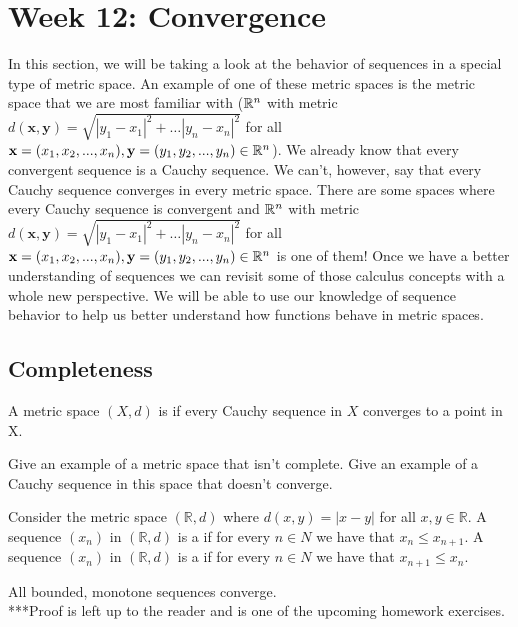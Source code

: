 \documentclass[../main.tex]{subfiles}
\begin{document}
\section{Week 12: Convergence}
In this section, we will be taking a look at the behavior of sequences in a special type of metric space. An example of one of these metric spaces is the metric space that we are most familiar with ($\mathbb R^n$ with metric $d(\textbf{x},\textbf{y}) = \sqrt{|y_1 - x_1|^2 + \dots |y_n - x_n|^2}$ for all $\textbf{x} = (x_1,x_2, ...,x_n), \textbf{y} = (y_1,y_2, ...,y_n) \in \mathbb R^n$). We already know that every convergent sequence is a Cauchy sequence. We can't, however, say that every Cauchy sequence converges in every metric space. There are some spaces where every Cauchy sequence is convergent and  $\mathbb R^n$ with metric $d(\textbf{x},\textbf{y}) = \sqrt{|y_1 - x_1|^2 + \dots |y_n - x_n|^2}$ for all $\textbf{x} = (x_1,x_2, ...,x_n), \textbf{y} = (y_1,y_2, ...,y_n) \in \mathbb R^n$ is one of them! Once we have a better understanding of sequences we can revisit some of those calculus concepts with a whole new perspective. We will be able to use our knowledge of sequence behavior to help us better understand how functions behave in metric spaces.

\subsection{Completeness}
\begin{definition}[completeness]
    A metric space $(X,d)$ is  if every Cauchy sequence in $X$ converges to a point in X.
\end{definition}
\begin{exercise}
Give an example of a metric space that isn't complete. Give an example of a Cauchy sequence in this space that doesn't converge.
\end{exercise}
\begin{definition}
    Consider the metric space $(\mathbb{R}, d)$ where $d(x, y) = |x - y|$ for all $x, y \in \mathbb{R}$. A sequence $(x_n)$ in $(\mathbb{R}, d)$ is a  if for every $n \in N$ we have that $x_n \leq x_{n+1}$. A sequence $(x_n)$ in $(\mathbb{R}, d)$ is a  if for every $n \in N$ we have that $x_{n+1} \leq x_{n}$.
\end{definition}
\begin{theorem}
    All bounded, monotone sequences converge. \\
    ***Proof is left up to the reader and is one of the upcoming homework exercises.
\end{theorem}
\end{document}
